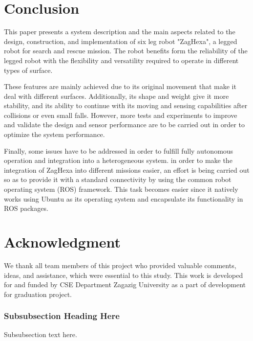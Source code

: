 \documentclass[conference]{IEEEtran}
\begin{document}
\section{Conclusion}
This paper presents a system description and the main aspects related to the design, construction, and implementation of six leg robot "ZagHexa", a legged robot for search and rescue mission. The robot benefits form the reliability of the legged robot with the ﬂexibility and versatility required to operate in different types of surface.

These features are mainly achieved due to its original movement that make it deal with different surfaces. Additionally, its shape and weight give it more stability, and its ability to continue with its moving and sensing capabilities after collisions or even small falls. However, more tests and experiments to improve and validate the design and sensor performance are to be carried out in order to optimize the system performance.

Finally, some issues have to be addressed in order to fulﬁll fully autonomous operation and integration into a heterogeneous system. in order to make the integration of ZagHexa into different missions easier, an effort is being carried out so as to provide it with a standard connectivity by using the common robot operating system (ROS) framework. This task becomes easier since it natively works using Ubuntu as its operating system and encapsulate its functionality in ROS packages.

\section*{Acknowledgment}
We thank all team members of this project who provided valuable comments, ideas, and assistance, which were essential to this study. This work is developed for and funded by CSE Department Zagazig University as a part of development for graduation project.


\subsubsection{Subsubsection Heading Here}
Subsubsection text here.
\end{document}
